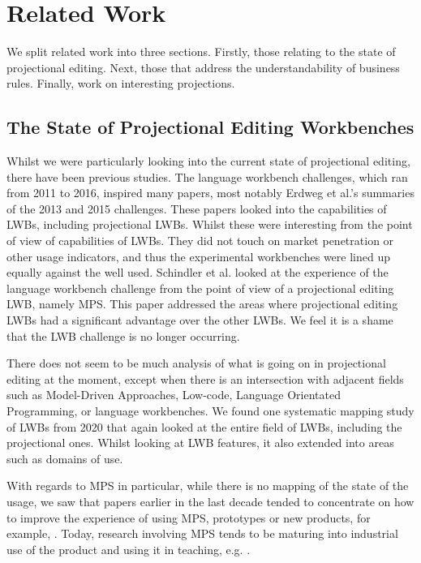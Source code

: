 \chapter{Related Work}
\label{chapter:RelatedWork}

We split related work into three sections. 
Firstly, those relating to the state of projectional editing.
Next, those that address the understandability of business rules.
Finally, work on interesting projections.

\section{The State of Projectional Editing Workbenches}

Whilst we were particularly looking into the current state of projectional editing, there have been previous studies.
The language workbench challenges, which ran from 2011 to 2016, inspired many papers, most notably Erdweg et al.'s summaries of the 2013\cite{erdweg2013state} and 2015\cite{erdweg2015evaluating} challenges.
These papers looked into the capabilities of LWBs, including projectional LWBs.
Whilst these were interesting from the point of view of capabilities of LWBs. 
They did not touch on market penetration or other usage indicators, and thus the experimental workbenches were lined up equally against the well used.
Schindler et al.\cite{schindler2016language} looked at the experience of the language workbench challenge from the point of view of a projectional editing LWB, namely MPS.
This paper addressed the areas where projectional editing LWBs had a significant advantage over the other LWBs. 
We feel it is a shame that the LWB challenge is no longer occurring.

There does not seem to be much analysis of what is going on in projectional editing at the moment, except when there is an intersection with adjacent fields such as Model-Driven Approaches, Low-code, Language Orientated Programming, or language workbenches.
We found one systematic mapping study of LWBs\cite{iung2020systematic} from 2020 that again looked at the entire field of LWBs, including the projectional ones.
Whilst looking at LWB features, it also extended into areas such as domains of use.

With regards to MPS in particular, while there is no mapping of the state of the usage, we saw that papers earlier in the last decade tended to concentrate on how to improve the experience of using MPS, prototypes or new products, for example, \cite{pavletic2013extensible,voelter2014generic,voelter2015using,voelter2010language2,voelter2013mbeddr,voelter2013requirements,voelter2014projecting,voelter2015towards,voelter2010embedded,voelter2011product,ratiu2012implementing}.
Today, research involving MPS tends to be maturing into industrial use of the product and using it in teaching, e.g. \cite{prinz2021teaching,voelterdomain_SLR, schindler2021jetbrains_SLR,simi2021learning_SLR,barash2021teaching_SLR,stotz2021migrating_SLR,ratiu2021use}.

